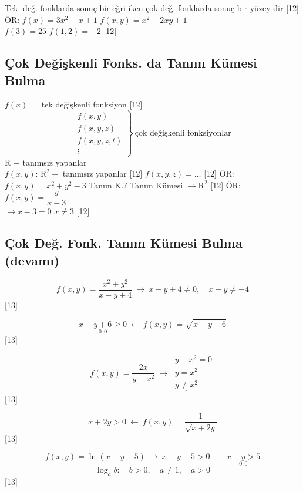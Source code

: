 \documentclass[11pt,a4paper]{article}
\begin{document}
Tek. değ. fonklarda sonuç bir eğri iken çok değ. fonklarda sonuç bir yüzey dir
[12]
ÖR: $f(x)=3x^2-x+1$ \quad $f(x,y)=x^2-2xy+1$\\
$f(3)=25$ \qquad $f(1,2)=-2$
[12]

\subsection{Çok Değişkenli Fonks. da Tanım Kümesi Bulma}
$f(x)=$ tek değişkenli fonksiyon
[12]
\[ \left.\begin{array}{l}f(x,y)\\ f(x,y,z)\\ f(x,y,z,t)\\ \vdots\end{array}\right\}\ \text{çok değişkenli fonksiyonlar} \]
R $-$ tanımsız yapanlar\\
$f(x,y)$: $\mathrm{R}^2-$ tanımsız yapanlar
[12]
$f(x,y,z)=\ldots$
[12]
ÖR: $f(x,y)=x^2+y^2-3$ \quad Tanım K.? \quad Tanım Kümesi $\to\mathrm{R}^2$
[12]
ÖR: $f(x,y)=\dfrac{y}{x-3}$\\
$\to x-3=0$ \quad $x\neq3$
[12]

\subsection{Çok Değ. Fonk. Tanım Kümesi Bulma (devamı)}
\[ f(x,y)=\frac{x^2+y^2}{x-y+4}\ \to\ x-y+4\neq0,\quad x-y\neq-4 \]
[13]

\[ \underset{0\ \ 0}{x-y+6\ge0}\ \leftarrow\ f(x,y)=\sqrt{x-y+6} \]
[13]

\[ f(x,y)=\frac{2x}{y-x^2}\ \to\ \begin{array}{l}y-x^2=0\\ y=x^2\\ \underline{y\neq x^2}\end{array} \]
[13]

\[ \underset{\ }{x+2y>0}\ \leftarrow\ f(x,y)=\frac{1}{\sqrt{x+2y}} \]
[13]

\[ f(x,y)=\ln(x-y-5)\ \to\ x-y-5>0\qquad \underset{0\ \ 0}{x-y>5} \]
\[ \log_a b:\quad b>0,\quad a\neq1,\quad a>0 \]
[13]
\end{document}
